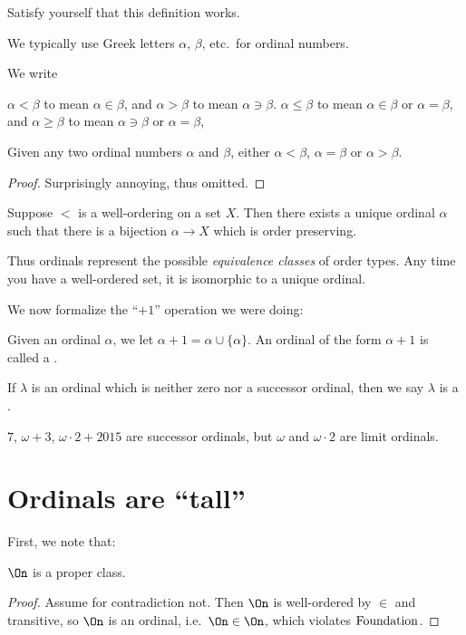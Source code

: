 \begin{ques}
	Satisfy yourself that this definition works.
\end{ques}

We typically use Greek letters $\alpha$, $\beta$, etc.\ for ordinal numbers.
\begin{definition}
	We write
	\begin{itemize}
		\ii $\alpha < \beta$ to mean $\alpha \in \beta$,
		and $\alpha > \beta$ to mean $\alpha \ni \beta$.
		\ii $\alpha \le \beta$ to mean $\alpha \in \beta$ or $\alpha = \beta$,
		and $\alpha \ge \beta$ to mean $\alpha \ni \beta$ or $\alpha = \beta$,
	\end{itemize}
\end{definition}

\begin{theorem}
	Given any two ordinal numbers $\alpha$ and $\beta$,
	either $\alpha < \beta$, $\alpha = \beta$ or $\alpha > \beta$.
\end{theorem}
\begin{proof}
	Surprisingly annoying, thus omitted.
\end{proof}
\begin{theorem}
	Suppose $<$ is a well-ordering on a set $X$.
	Then there exists a unique ordinal $\alpha$
	such that there is a bijection $\alpha \to X$
	which is order preserving.
\end{theorem}
Thus ordinals represent the possible \emph{equivalence classes} of order types.
Any time you have a well-ordered set, it is isomorphic to a unique ordinal.

We now formalize the ``$+1$'' operation we were doing:
\begin{definition}
	Given an ordinal $\alpha$, we let $\alpha+1 = \alpha \cup \{\alpha\}$.
	An ordinal of the form $\alpha+1$ is called a .
\end{definition}
\begin{definition}
	If $\lambda$ is an ordinal which is neither zero nor a successor ordinal,
	then we say $\lambda$ is a .
\end{definition}
\begin{example}
	$7$, $\omega+3$, $\omega\cdot2+2015$ are successor ordinals,
	but $\omega$ and $\omega \cdot 2$ are limit ordinals.
\end{example}

\section{Ordinals are ``tall''}
First, we note that:
\begin{theorem}
	$\On$ is a proper class.
\end{theorem}
\begin{proof}
	Assume for contradiction not.
	Then $\On$ is well-ordered by $\in$ and transitive, so $\On$ is an ordinal,
	i.e.\ $\On \in \On$, which violates $\mathrm{Foundation}$.
\end{proof}

